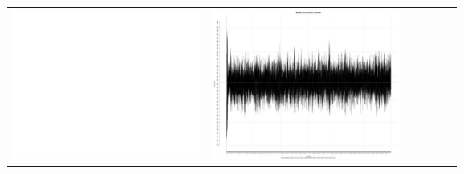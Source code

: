 \begin{table}[htbp]
{\begin{tabular}{l | ccccc}
\begin{minipage}{.15\textwidth}
     			 	\includegraphics[width=\linewidth]{images/mema-triple/N5}
    				 \end{minipage}
    			   &	 \begin{minipage}{.15\textwidth}\vspace{2pt}     							
     			 	\includegraphics[width=\linewidth]{images/mema-triple/N9}
    				 \end{minipage}
    			   &	 \begin{minipage}{.15\textwidth}\vspace{2pt}     							

\end{minipage}
\end{tabular}}
\end{table}
